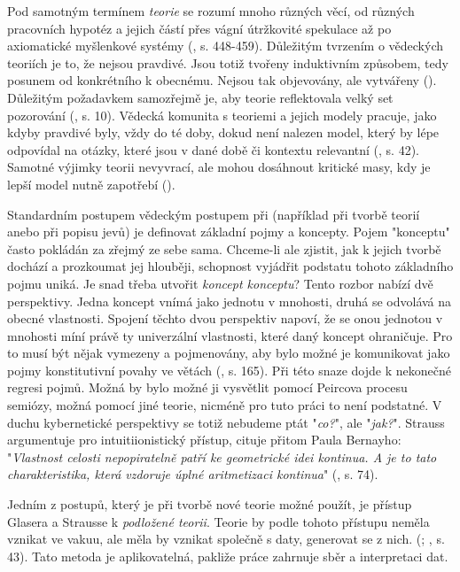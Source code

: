 \documentclass[11pt,a4paper]{article}
\begin{document}
Pod samotným termínem \textit{teorie} se rozumí mnoho různých věcí, od různých pracovních hypotéz a jejich částí přes vágní útržkovité spekulace až po axiomatické myšlenkové systémy (\cite{calhoun_sociological_2007}, s. 448-459). Důležitým tvrzením o vědeckých teoriích je to, že nejsou pravdivé. Jsou totiž tvořeny induktivním způsobem, tedy posunem od konkrétního k obecnému. Nejsou tak objevovány, ale vytvářeny (\cite{mintzberg_developing_2014}). Důležitým požadavkem samozřejmě je, aby teorie reflektovala velký set pozorování (\cite{hawking_brief_1998}, s. 10). Vědecká komunita s teoriemi a jejich modely pracuje, jako kdyby pravdivé byly, vždy do té doby, dokud není nalezen model, který by lépe odpovídal na otázky, které jsou v dané době či kontextu relevantní (\cite{barbara_m_wildemuth_questions_2017}, s. 42). Samotné výjimky teorii nevyvrací, ale mohou dosáhnout kritické masy, kdy je lepší model nutně zapotřebí (\cite{kuhn_structure_2012}).

Standardním postupem vědeckým postupem při (například při tvorbě teorií anebo při popisu jevů) je definovat základní pojmy a koncepty. Pojem "konceptu" často pokládán za zřejmý ze sebe sama. Chceme-li ale zjistit, jak k jejich tvorbě dochází a prozkoumat jej hlouběji, schopnost vyjádřit podstatu tohoto základního pojmu uniká. Je snad třeba utvořit \textit{koncept konceptu}? Tento rozbor nabízí dvě perspektivy. Jedna koncept vnímá jako jednotu v mnohosti, druhá se odvolává na obecné vlastnosti. Spojení těchto dvou perspektiv napoví, že se onou jednotou v mnohosti míní právě ty univerzální vlastnosti, které daný koncept ohraničuje. Pro to musí být nějak vymezeny a pojmenovány, aby bylo možné je komunikovat jako pojmy konstitutivní povahy ve větách (\cite{strauss_scope_2002}, s. 165). Při této snaze dojde k nekonečné regresi pojmů. Možná by bylo možné ji vysvětlit pomocí Peircova procesu semiózy, možná pomocí jiné teorie, nicméně pro tuto práci to není podstatné. V duchu kybernetické perspektivy se totiž nebudeme ptát "\textit{co?}", ale "\textit{jak?}". Strauss argumentuje pro intuitiionistický přístup, cituje přitom Paula Bernayho: "\textit{Vlastnost celosti nepopiratelně patří ke geometrické idei kontinua. A je to tato charakteristika, která vzdoruje úplné aritmetizaci kontinua}" (\cite{strauss_scope_2002, bernays_abhandlungen_1976}, s. 74). 

Jedním z postupů, který je při tvorbě nové teorie možné použít, je přístup Glasera a Strausse k \textit{podložené teorii}. Teorie by podle tohoto přístupu neměla vznikat ve vakuu, ale měla by vznikat společně s daty, generovat se z nich. (\cite{glaser_discovery_2017}; \cite{barbara_m_wildemuth_questions_2017}, s. 43). Tato metoda je aplikovatelná, pakliže práce zahrnuje sběr a interpretaci dat.
\end{document}
